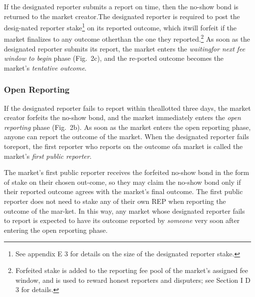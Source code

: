 \documentclass[12pt,floatfix,reprint,nofootinbib,amsmath,amssymb,epsfig,pre,floats,letterpaper,groupedaffiliation]{revtex4-1}
\theoremstyle{definition}
\theoremstyle{definition}
\begin{document}
If the designated reporter submits a report on time, then the no-show bond is returned to the market creator.\linebreak The designated reporter is required to post the desig-\linebreak nated reporter stake\footnote{See appendix E 3 for details on the size of the designated reporter stake.} on its reported outcome, which it\linebreak will forfeit if the market finalizes to any outcome other\linebreak than the one they reported.\footnote{Forfeited stake is added to the reporting fee pool of the market's assigned fee window, and is used to reward honest reporters and disputers; see Section I D 3 for details.} As soon as the designated reporter submits its report, the market enters the \textit{waiting\linebreak for next fee window to begin} phase (Fig.~2c), and the re-\linebreak ported outcome becomes the market's \textit{tentative outcome}.

\subsubsection{Open Reporting}

If the designated reporter fails to report within the\linebreak allotted three days, the market creator forfeits the no-show bond, and the market immediately enters the \textit{open reporting} phase (Fig.~2b). As soon as the market enters the open reporting phase, anyone can report the outcome of the market. When the designated reporter fails to\pagebreak \linebreak report, the first reporter who reports on the outcome of\linebreak a market is called the market's \textit{first public reporter}.

The market's first public reporter receives the forfeited no-show bond in the form of stake on their chosen out-\linebreak come, so they may claim the no-show bond only if their reported outcome agrees with the market's final outcome. The first public reporter does not need to stake any of their own REP when reporting the outcome of the mar-\linebreak ket. In this way, any market whose designated reporter fails to report is expected to have its outcome reported by \textit{someone} very soon after entering the open reporting phase.
\end{document}
